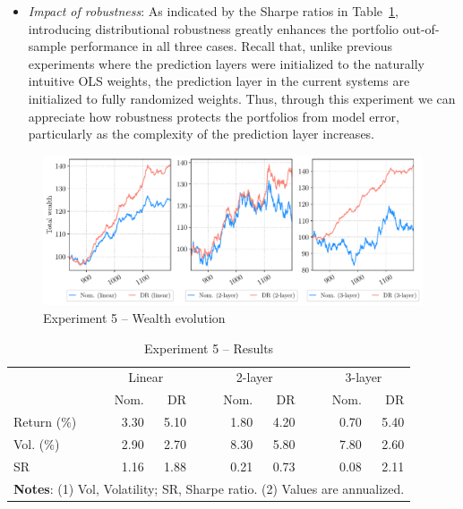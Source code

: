 \documentclass[10pt, twocolumn]{article}
\theoremstyle{plain}
\theoremstyle{definition}
\begin{document}
\begin{itemize}[itemsep=-0.15em, topsep=0pt, leftmargin=*]
  
\item \emph{Impact of robustness}: As indicated by the Sharpe ratios in
  Table~\ref{table:exp5_results}, introducing distributional robustness  
  greatly enhances the portfolio out-of-sample performance in all three cases. 
  Recall that, unlike previous experiments where the prediction layers were
  initialized to the naturally intuitive OLS weights, the prediction layer in 
  the current systems are initialized to fully randomized weights. Thus, 
  through this experiment we can appreciate how robustness protects the 
  portfolios from model error, particularly as the complexity of the 
  prediction layer increases. 
    
\end{itemize}

\begin{figure}[ht]
\begin{center}
\centerline{\includegraphics[width=\textwidth]{figs/wealth_exp5.pdf}}
\caption{Experiment 5 -- Wealth evolution}
\label{fig:exp5_wealth}
\end{center}
\vskip -0.2in
\end{figure}

\begin{table}[t]
\caption{Experiment 5 -- Results}
\centering
\begin{tabular}{lrrr@{}rrr@{}rr}
\toprule
				& \multicolumn{2}{c}{Linear} && \multicolumn{2}{c}{2-layer} && \multicolumn{2}{c}{3-layer}\\[0.5ex] \cline{2-3} \cline{5-6} \cline{8-9}
\rule{0pt}{3ex}& Nom. & DR && Nom. & DR && Nom. & DR \\
\midrule
Return (\%) & 3.30 & 5.10 && 1.80 & 4.20 && 0.70 & 5.40 \\
Vol. (\%) 	& 2.90 & 2.70 && 8.30 & 5.80 && 7.80 & 2.60 \\
SR    		& 1.16 & 1.88 && 0.21 & 0.73 && 0.08 & 2.11 \\
\bottomrule
\multicolumn{9}{p{0.99\linewidth}}{\small\rule{0pt}{3ex}\textbf{Notes}: (1) Vol, Volatility; SR, Sharpe ratio. (2) Values are annualized.}\\
\end{tabular}
\label{table:exp5_results}
\end{table}
\end{document}
